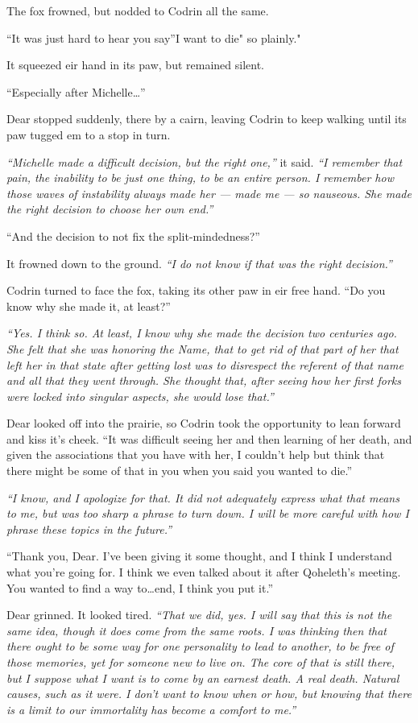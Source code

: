 The fox frowned, but nodded to Codrin all the same.

``It was just hard to hear you say''I want to die" so plainly."

It squeezed eir hand in its paw, but remained silent.

``Especially after Michelle\ldots{}''

Dear stopped suddenly, there by a cairn, leaving Codrin to keep walking until its paw tugged em to a stop in turn.

\emph{``Michelle made a difficult decision, but the right one,''} it said. \emph{``I remember that pain, the inability to be just one thing, to be an entire person. I remember how those waves of instability always made her — made me — so nauseous. She made the right decision to choose her own end.''}

``And the decision to not fix the split-mindedness?''

It frowned down to the ground. \emph{``I do not know if that was the right decision.''}

Codrin turned to face the fox, taking its other paw in eir free hand. ``Do you know why she made it, at least?''

\emph{``Yes. I think so. At least, I know why she made the decision two centuries ago. She felt that she was honoring the Name, that to get rid of that part of her that left her in that state after getting lost was to disrespect the referent of that name and all that they went through. She thought that, after seeing how her first forks were locked into singular aspects, she would lose that.''}

Dear looked off into the prairie, so Codrin took the opportunity to lean forward and kiss it's cheek. ``It was difficult seeing her and then learning of her death, and given the associations that you have with her, I couldn't help but think that there might be some of that in you when you said you wanted to die.''

\emph{``I know, and I apologize for that. It did not adequately express what that means to me, but was too sharp a phrase to turn down. I will be more careful with how I phrase these topics in the future.''}

``Thank you, Dear. I've been giving it some thought, and I think I understand what you're going for. I think we even talked about it after Qoheleth's meeting. You wanted to find a way to\ldots end, I think you put it.''

Dear grinned. It looked tired. \emph{``That we did, yes. I will say that this is not the same idea, though it does come from the same roots. I was thinking then that there ought to be some way for one personality to lead to another, to be free of those memories, yet for someone new to live on. The core of that is still there, but I suppose what I want is to come by an earnest death. A real death. Natural causes, such as it were. I don't want to know when or how, but knowing that there is a limit to our immortality has become a comfort to me.''}

